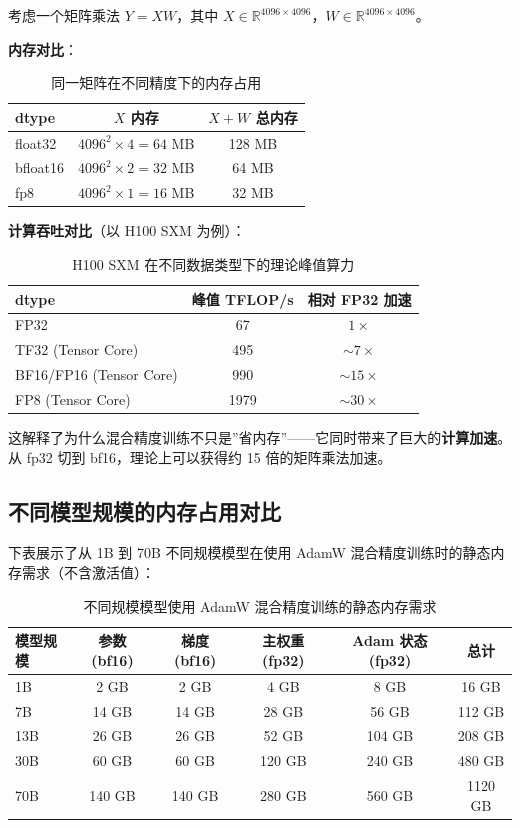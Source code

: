 \documentclass[a4paper]{article}
\begin{document}
考虑一个矩阵乘法 $Y = XW$，其中 $X \in \mathbb{R}^{4096 \times 4096}$，$W \in \mathbb{R}^{4096 \times 4096}$。

\textbf{内存对比}：
\begin{table}[H]
\centering
\begin{tabular}{lcc}
\toprule
\textbf{dtype} & \textbf{$X$ 内存} & \textbf{$X + W$ 总内存} \\
\midrule
float32 & $4096^2 \times 4 = 64$ MB & 128 MB \\
bfloat16 & $4096^2 \times 2 = 32$ MB & 64 MB \\
fp8 & $4096^2 \times 1 = 16$ MB & 32 MB \\
\bottomrule
\end{tabular}
\caption{同一矩阵在不同精度下的内存占用}
\end{table}

\textbf{计算吞吐对比}（以 H100 SXM 为例）：
\begin{table}[H]
\centering
\begin{tabular}{lcc}
\toprule
\textbf{dtype} & \textbf{峰值 TFLOP/s} & \textbf{相对 FP32 加速} \\
\midrule
FP32 & 67 & $1\times$ \\
TF32 (Tensor Core) & 495 & $\sim 7\times$ \\
BF16/FP16 (Tensor Core) & 990 & $\sim 15\times$ \\
FP8 (Tensor Core) & 1979 & $\sim 30\times$ \\
\bottomrule
\end{tabular}
\caption{H100 SXM 在不同数据类型下的理论峰值算力}
\end{table}

这解释了为什么混合精度训练不只是”省内存”——它同时带来了巨大的\textbf{计算加速}。从 fp32 切到 bf16，理论上可以获得约 15 倍的矩阵乘法加速。

\subsection{不同模型规模的内存占用对比}

下表展示了从 1B 到 70B 不同规模模型在使用 AdamW 混合精度训练时的静态内存需求（不含激活值）：

\begin{table}[H]
\centering
\begin{tabular}{lccccc}
\toprule
\textbf{模型规模} & \textbf{参数 (bf16)} & \textbf{梯度 (bf16)} & \textbf{主权重 (fp32)} & \textbf{Adam 状态 (fp32)} & \textbf{总计} \\
\midrule
1B & 2 GB & 2 GB & 4 GB & 8 GB & 16 GB \\
7B & 14 GB & 14 GB & 28 GB & 56 GB & 112 GB \\
13B & 26 GB & 26 GB & 52 GB & 104 GB & 208 GB \\
30B & 60 GB & 60 GB & 120 GB & 240 GB & 480 GB \\
70B & 140 GB & 140 GB & 280 GB & 560 GB & 1120 GB \\
\bottomrule
\end{tabular}
\caption{不同规模模型使用 AdamW 混合精度训练的静态内存需求}
\end{table}
\end{document}
